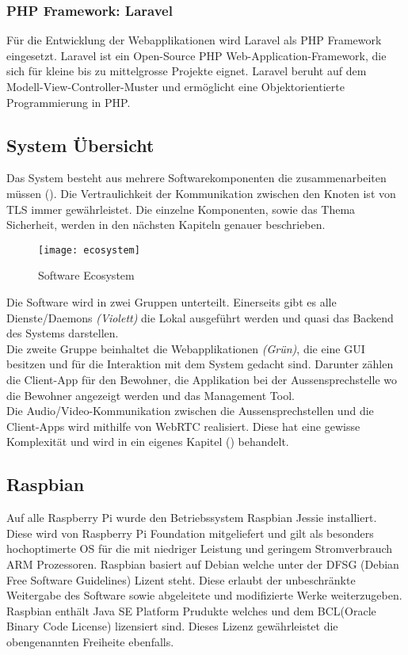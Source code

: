 \subsubsection{PHP Framework: Laravel}
Für die Entwicklung der Webapplikationen wird Laravel als PHP Framework eingesetzt. Laravel ist ein Open-Source PHP Web-Application-Framework, die sich für kleine bis zu mittelgrosse Projekte eignet. Laravel beruht auf dem Modell-View-Controller-Muster und ermöglicht eine Objektorientierte Programmierung in PHP.

\subsection{System Übersicht}
Das System besteht aus mehrere Softwarekomponenten die zusammenarbeiten müssen (). Die  Vertraulichkeit der Kommunikation zwischen den Knoten ist von TLS immer gewährleistet. Die einzelne Komponenten, sowie das Thema Sicherheit, werden in den nächsten Kapiteln genauer beschrieben.

\begin{figure}[htb!]
	\begin{center}
		\texttt{[image: ecosystem]}
		\caption[Software Ecosystem]{Software Ecosystem}
		\label{fig:echosystem}
	\end{center}
\end{figure}

Die Software wird in zwei Gruppen unterteilt. Einerseits gibt es alle Dienste/Daemons \textit{(Violett)} die Lokal ausgeführt werden und quasi das Backend des Systems darstellen.
\\
Die zweite Gruppe beinhaltet die Webapplikationen \textit{(Grün)}, die eine GUI besitzen und für die Interaktion mit dem System gedacht sind. Darunter zählen die Client-App für den Bewohner, die Applikation bei der Aussensprechstelle wo die Bewohner angezeigt werden und das Management Tool.
\\
Die Audio/Video-Kommunikation zwischen die Aussensprechstellen und die Client-Apps wird mithilfe von WebRTC realisiert. Diese hat eine gewisse Komplexität und wird in ein eigenes Kapitel () behandelt.

\subsection{Raspbian}
\label{kap:raspbian}
Auf alle Raspberry Pi wurde den Betriebssystem Raspbian Jessie installiert. Diese wird von Raspberry Pi Foundation mitgeliefert und gilt als besonders hochoptimerte OS für die mit niedriger Leistung und geringem Stromverbrauch ARM Prozessoren.
Raspbian basiert auf Debian welche unter der DFSG (Debian Free Software Guidelines) Lizent steht. Diese erlaubt der unbeschränkte Weitergabe des Software sowie abgeleitete und modifizierte  Werke weiterzugeben. 
Raspbian enthält Java SE Platform Prudukte welches und dem BCL(Oracle Binary Code License) lizensiert sind. Dieses Lizenz gewährleistet die obengenannten Freiheite ebenfalls.

